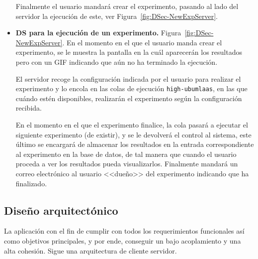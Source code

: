 \begin{itemize}
Finalmente el usuario mandará crear el experimento, pasando al lado del servidor la ejecución de este, ver Figura~\ref{fig:DSec-NewExpServer}.

\item \textbf{DS para la ejecución de un experimento.} Figura~\ref{fig:DSec-NewExpServer}. En el momento en el que el usuario manda crear el experimento, se le muestra la pantalla en la cuál aparecerán los resultados pero con un GIF indicando que aún no ha terminado la ejecución. 

El servidor recoge la configuración indicada por el usuario para realizar el experimento y lo encola en las colas de ejecución \texttt{high-ubumlaas}, en las que cuándo estén disponibles, realizarán el experimento según la configuración recibida. 

En el momento en el que el experimento finalice, la cola pasará a ejecutar el siguiente experimento (de existir), y se le devolverá el control al sistema, este último se encargará de almacenar los resultados en la entrada correspondiente al experimento en la base de datos, de tal manera que cuando el usuario proceda a ver los resultados pueda visualizarlos. Finalmente mandará un correo electrónico al usuario <<dueño>> del experimento indicando que ha finalizado.

\end{itemize}

\clearpage
{}
\begin{landscape}
\end{landscape}

\subsection{Diseño arquitectónico}
La aplicación con el fin de cumplir con todos los requerimientos funcionales así como objetivos principales, y por ende, conseguir un bajo acoplamiento y una alta cohesión. Sigue una arquitectura de cliente servidor.


